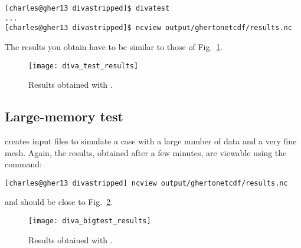 \begin{lstlisting}[style=Bash]
[charles@gher13 divastripped]$ divatest
...
[charles@gher13 divastripped]$ ncview output/ghertonetcdf/results.nc
\end{lstlisting}
The results you obtain have to be similar to those of Fig.~\ref{fig:diva_test_results}.

\begin{figure}[H]
\centering 
\texttt{[image: diva\_test\_results]}
\caption{Results obtained with .\label{fig:diva_test_results}}
\end{figure}

\subsection{Large-memory test}

 creates input files to simulate a case with a large number of data and a very fine mesh. Again, the results, obtained after a few minutes, are viewable using the command:
\begin{lstlisting}[style=Bash]
[charles@gher13 divastripped] ncview output/ghertonetcdf/results.nc
\end{lstlisting}
and should be close to Fig.~\ref{fig:diva_bigtest_results}.

\begin{figure}[H]
\centering 
\texttt{[image: diva\_bigtest\_results]}
\caption{Results obtained with .\label{fig:diva_bigtest_results}}
\end{figure}




